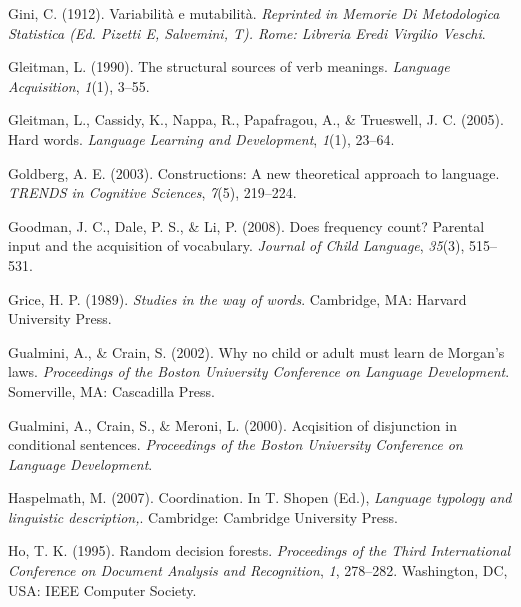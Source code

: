 \documentclass[
  ,man,floatsintext]{apa6}
\newlength{\cslhangindent}
\newlength{\cslentryspacingunit} %
\newenvironment{CSLReferences}[2] %
 {%
  \setlength{\parindent}{0pt}
  \ifodd #1
  \let\oldpar\par
  \def\par{\hangindent=\cslhangindent\oldpar}
  \fi
  \setlength{\parskip}{#2\cslentryspacingunit}
 }%
 {}
\begin{document}
\begin{CSLReferences}{1}{0}
\leavevmode{}%
Gini, C. (1912). Variabilit{à} e mutabilit{à}. \emph{Reprinted in Memorie Di Metodologica Statistica (Ed. Pizetti E, Salvemini, T). Rome: Libreria Eredi Virgilio Veschi}.

\leavevmode{}%
Gleitman, L. (1990). The structural sources of verb meanings. \emph{Language Acquisition}, \emph{1}(1), 3--55.

\leavevmode{}%
Gleitman, L., Cassidy, K., Nappa, R., Papafragou, A., \& Trueswell, J. C. (2005). Hard words. \emph{Language Learning and Development}, \emph{1}(1), 23--64.

\leavevmode{}%
Goldberg, A. E. (2003). Constructions: A new theoretical approach to language. \emph{{TRENDS} in {C}ognitive {S}ciences}, \emph{7}(5), 219--224.

\leavevmode{}%
Goodman, J. C., Dale, P. S., \& Li, P. (2008). Does frequency count? Parental input and the acquisition of vocabulary. \emph{Journal of Child Language}, \emph{35}(3), 515--531.

\leavevmode{}%
Grice, H. P. (1989). \emph{Studies in the way of words}. Cambridge, MA: Harvard University Press.

\leavevmode{}%
Gualmini, A., \& Crain, S. (2002). Why no child or adult must learn de {M}organ's laws. \emph{Proceedings of the {B}oston {U}niversity Conference on Language Development}. Somerville, MA: Cascadilla Press.

\leavevmode{}%
Gualmini, A., Crain, S., \& Meroni, L. (2000). Acqisition of disjunction in conditional sentences. \emph{Proceedings of the Boston University Conference on Language Development}.

\leavevmode{}%
Haspelmath, M. (2007). Coordination. In T. Shopen (Ed.), \emph{Language typology and linguistic description,}. Cambridge: Cambridge University Press.

\leavevmode{}%
Ho, T. K. (1995). Random decision forests. \emph{Proceedings of the Third International Conference on Document Analysis and Recognition}, \emph{1}, 278--282. Washington, DC, USA: {IEEE} Computer Society.


\end{CSLReferences}
\end{document}
